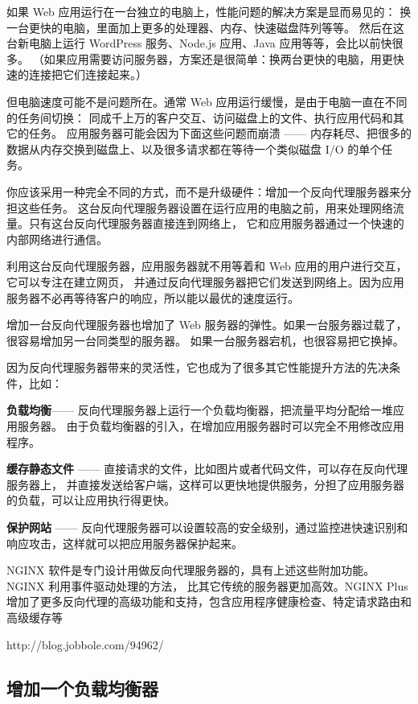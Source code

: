 \documentclass{book}
\begin{document}
如果 Web 应用运行在一台独立的电脑上，性能问题的解决方案是显而易见的：
换一台更快的电脑，里面加上更多的处理器、内存、快速磁盘阵列等等。
然后在这台新电脑上运行 WordPress 服务、Node.js 应用、Java 应用等等，会比以前快很多。
（如果应用需要访问服务器，方案还是很简单：换两台更快的电脑，用更快速的连接把它们连接起来。）

但电脑速度可能不是问题所在。通常 Web 应用运行缓慢，是由于电脑一直在不同的任务间切换：
同成千上万的客户交互、访问磁盘上的文件、执行应用代码和其它的任务。
应用服务器可能会因为下面这些问题而崩溃 —— 内存耗尽、把很多的数据从内存交换到磁盘上、以及很多请求都在等待一个类似磁盘 I/O 的单个任务。

你应该采用一种完全不同的方式，而不是升级硬件：增加一个反向代理服务器来分担这些任务。
这台反向代理服务器设置在运行应用的电脑之前，用来处理网络流量。只有这台反向代理服务器直接连到网络上，
它和应用服务器通过一个快速的内部网络进行通信。

利用这台反向代理服务器，应用服务器就不用等着和 Web 应用的用户进行交互，它可以专注在建立网页，
并通过反向代理服务器把它们发送到网络上。因为应用服务器不必再等待客户的响应，所以能以最优的速度运行。

增加一台反向代理服务器也增加了 Web 服务器的弹性。如果一台服务器过载了，很容易增加另一台同类型的服务器。
如果一台服务器宕机，也很容易把它换掉。

因为反向代理服务器带来的灵活性，它也成为了很多其它性能提升方法的先决条件，比如：

\textbf{负载均衡}—— 反向代理服务器上运行一个负载均衡器，把流量平均分配给一堆应用服务器。
由于负载均衡器的引入，在增加应用服务器时可以完全不用修改应用程序。

\textbf{缓存静态文件} —— 直接请求的文件，比如图片或者代码文件，可以存在反向代理服务器上，
并直接发送给客户端，这样可以更快地提供服务，分担了应用服务器的负载，可以让应用执行得更快。

\textbf{保护网站} —— 反向代理服务器可以设置较高的安全级别，通过监控进快速识别和响应攻击，这样就可以把应用服务器保护起来。

NGINX 软件是专门设计用做反向代理服务器的，具有上述这些附加功能。NGINX 利用事件驱动处理的方法，
比其它传统的服务器更加高效。NGINX Plus 增加了更多反向代理的高级功能和支持，包含应用程序健康检查、特定请求路由和高级缓存等

http://blog.jobbole.com/94962/

\subsection{增加一个负载均衡器}
\end{document}
